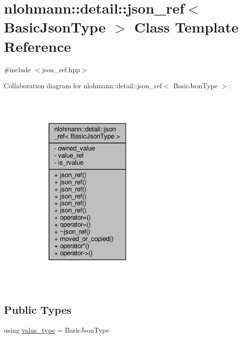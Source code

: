 \hypertarget{classnlohmann_1_1detail_1_1json__ref}{}\section{nlohmann\+:\+:detail\+:\+:json\+\_\+ref$<$ Basic\+Json\+Type $>$ Class Template Reference}
\label{classnlohmann_1_1detail_1_1json__ref}


{\ttfamily \#include $<$json\+\_\+ref.\+hpp$>$}



Collaboration diagram for nlohmann\+:\+:detail\+:\+:json\+\_\+ref$<$ Basic\+Json\+Type $>$\+:
\nopagebreak
\begin{figure}[H]
\begin{center}
\leavevmode
\includegraphics[width=199pt]{classnlohmann_1_1detail_1_1json__ref__coll__graph}
\end{center}
\end{figure}
\subsection*{Public Types}
\begin{DoxyCompactItemize}
\item 
using \hyperlink{classnlohmann_1_1detail_1_1json__ref_a78d76cf288141049568c0d670ed670ef}{value\+\_\+type} = Basic\+Json\+Type
\end{DoxyCompactItemize}
